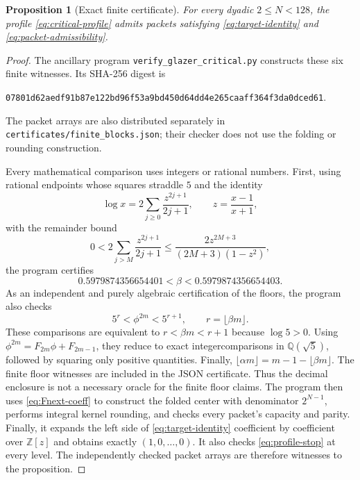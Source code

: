 \documentclass[11pt]{article}
\newtheorem{proposition}[theorem]{Proposition}
\theoremstyle{definition}
\theoremstyle{remark}
\begin{document}
\begin{proposition}[Exact finite certificate]\label{prop:finite-certificate}
For every dyadic $2\le N<128$, the profile \eqref{eq:critical-profile}
admits packets satisfying \eqref{eq:target-identity} and
\eqref{eq:packet-admissibility}.
\end{proposition}
\begin{proof}
The ancillary program \texttt{verify\_glazer\_critical.py} constructs these
six finite witnesses. Its SHA-256 digest is
\begin{center}
\small\texttt{07801d62aedf91b87e122bd96f53a9bd450d64dd4e265caaff364f3da0dced61}.
\end{center}
The packet arrays are also distributed separately in
\texttt{certificates/finite\_blocks.json}; their checker does not use the
folding or rounding construction.

Every mathematical comparison uses integers or rational numbers. First,
using rational endpoints whose squares straddle $5$ and the identity
\[
 \log x=2\sum_{j\ge0}\frac{z^{2j+1}}{2j+1},
 \qquad z=\frac{x-1}{x+1},
\]
with the remainder bound
\[
 0<2\sum_{j>M}\frac{z^{2j+1}}{2j+1}
 \le\frac{2z^{2M+3}}{(2M+3)(1-z^2)},
\]
the program certifies
\begin{equation}\label{eq:beta-enclosure}
 0.5979874356654401<\beta<0.5979874356654403.
\end{equation}
As an independent and purely algebraic certification of the floors,
the program also checks
\begin{equation}\label{eq:algebraic-floor}
 5^r<\phi^{2m}<5^{r+1},\qquad r=\lfloor\beta m\rfloor.
\end{equation}
These comparisons are equivalent to $r<\beta m<r+1$ because $\log5>0$.
Using $\phi^{2m}=F_{2m}\phi+F_{2m-1}$, they reduce to exact integercomparisons in $\mathbb Q(\sqrt5)$, followed by squaring only positive
quantities. Finally,
$\lfloor\alpha m\rfloor=m-1-\lfloor\beta m\rfloor$.
The finite floor witnesses are included in the JSON certificate.
Thus the decimal enclosure is not a necessary oracle for the finite
floor claims.
The program then uses \eqref{eq:Fnext-coeff} to construct the folded
center with denominator $2^{N-1}$, performs integral kernel rounding,
and checks every packet's capacity and parity. Finally, it expands the
left side of \eqref{eq:target-identity} coefficient by coefficient over
$\mathbb Z[z]$ and obtains exactly $(1,0,\ldots,0)$. It also checks
\eqref{eq:profile-stop} at every level. The independently checked packet
arrays are therefore witnesses to the proposition.


\end{proof}
\end{document}
